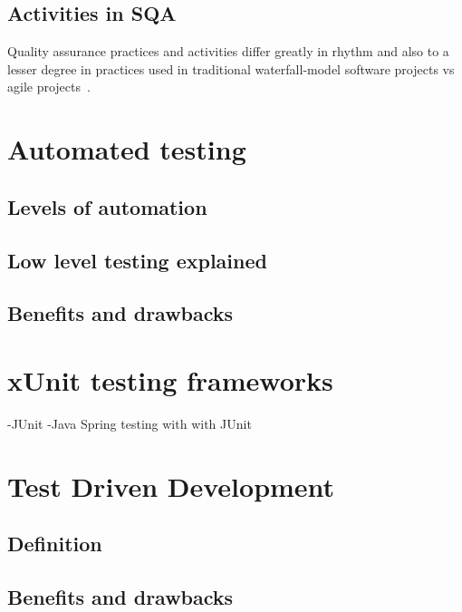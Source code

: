     \subsection{Activities in SQA}
    Quality assurance practices and activities differ greatly in rhythm and also to a lesser degree in practices used in traditional waterfall-model
    software projects vs agile projects~\cite{huo2004software}.

\section{Automated testing} %
    \subsection{Levels of automation}
    \subsection{Low level testing explained}
    \subsection{Benefits and drawbacks}
\section{xUnit testing frameworks} %
-JUnit\newline
-Java Spring testing with with JUnit\newline
\section{Test Driven Development} %
    \subsection{Definition}
    \subsection{Benefits and drawbacks}
